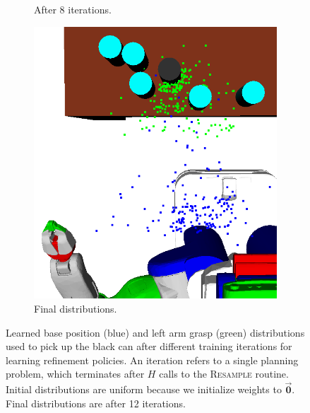 \begin{figure}[t]
\begin{subfigure}[b]{0.35\linewidth}
    \caption{After 8 iterations.}
  \end{subfigure}
  \begin{subfigure}[b]{0.35\linewidth}
    \includegraphics[width=\textwidth]{images/learn12.png}
    \caption{Final distributions.}
  \end{subfigure}
  \caption{\small{Learned base position (blue) and left arm grasp (green) distributions used to
pick up the black can after different training iterations for learning refinement policies.
An iteration refers to a single planning problem,
which terminates after $H$ calls to the \textsc{Resample} routine.
Initial distributions are uniform because we initialize weights to $\vec{\mathbf{0}}$.
Final distributions are after 12 iterations.}}
  \label{fig:training}
\end{figure}

